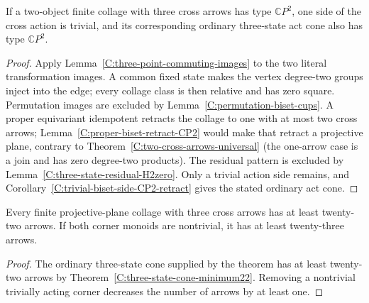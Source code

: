 \begin{theorem}
\label{C:three-cross-arrows-act-reduction}
If a two-object finite collage with three cross arrows has
type $\mathbb CP^2$, one side of the cross action is trivial,
and its corresponding ordinary three-state act cone also has
type $\mathbb CP^2$.
\end{theorem}
\begin{proof}
Apply Lemma~\ref{C:three-point-commuting-images} to the two
literal transformation images.  A common fixed state makes
the vertex degree-two groups inject into the edge; every
collage class is then relative and has zero square.
Permutation images are excluded by
Lemma~\ref{C:permutation-biset-cups}.
A proper equivariant idempotent retracts the collage to one
with at most two cross arrows; Lemma~\ref{C:proper-biset-retract-CP2}
would make that retract a projective plane, contrary to
Theorem~\ref{C:two-cross-arrows-universal} (the one-arrow
case is a join and has zero degree-two products).
The residual pattern is excluded by
Lemma~\ref{C:three-state-residual-H2zero}.
Only a trivial action side remains, and
Corollary~\ref{C:trivial-biset-side-CP2-retract} gives the
stated ordinary act cone.
\end{proof}

\begin{corollary}\label{C:three-cross-arrows-lower22}
Every finite projective-plane collage with three cross arrows
has at least twenty-two arrows.  If both corner monoids are
nontrivial, it has at least twenty-three arrows.
\end{corollary}
\begin{proof}
The ordinary three-state cone supplied by the theorem has at
least twenty-two arrows by Theorem~\ref{C:three-state-cone-minimum22}.
Removing a nontrivial trivially acting corner decreases the
number of arrows by at least one.
\end{proof}
